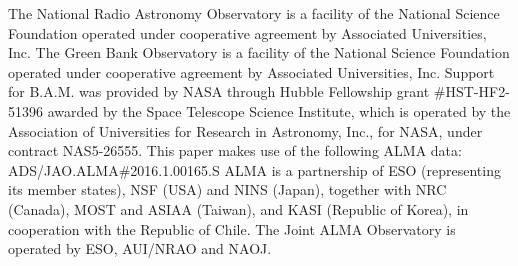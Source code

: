 \documentclass[twocolumn]{aastex62}
\begin{document}
\acknowledgements
The National Radio Astronomy Observatory is a facility of the National Science
Foundation operated under cooperative agreement by Associated Universities,
Inc. The Green Bank Observatory is a facility of the National Science
Foundation operated under cooperative agreement by Associated Universities,
Inc. Support for B.A.M. was provided by NASA through Hubble Fellowship grant
\#HST-HF2-51396 awarded by the Space Telescope Science Institute, which is
operated by the Association of Universities for Research in Astronomy, Inc.,
for NASA, under contract NAS5-26555. 
This paper makes use of the following ALMA data: ADS/JAO.ALMA\#2016.1.00165.S
ALMA is a partnership of ESO (representing its member states), NSF (USA) and
NINS (Japan), together with NRC (Canada), MOST and ASIAA (Taiwan), and KASI
(Republic of Korea), in cooperation with the Republic of Chile. The Joint ALMA
Observatory is operated by ESO, AUI/NRAO and NAOJ.


\end{document}

